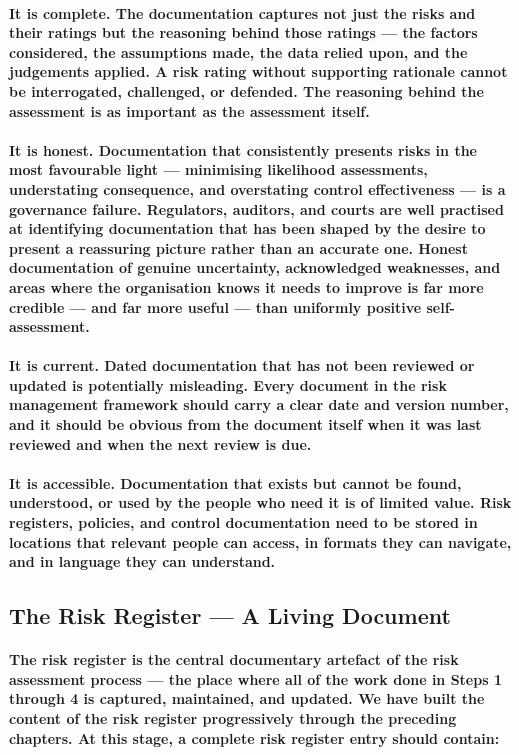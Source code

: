 \paragraph{\textbf{It is complete}. The documentation captures not just the risks and their ratings but the reasoning behind those ratings — the factors considered, the assumptions made, the data relied upon, and the judgements applied. A risk rating without supporting rationale cannot be interrogated, challenged, or defended. The reasoning behind the assessment is as important as the assessment itself.}
\paragraph{\textbf{It is honest}. Documentation that consistently presents risks in the most favourable light — minimising likelihood assessments, understating consequence, and overstating control effectiveness — is a governance failure. Regulators, auditors, and courts are well practised at identifying documentation that has been shaped by the desire to present a reassuring picture rather than an accurate one. Honest documentation of genuine uncertainty, acknowledged weaknesses, and areas where the organisation knows it needs to improve is far more credible — and far more useful — than uniformly positive self-assessment.}
\paragraph{It is current. Dated documentation that has not been reviewed or updated is potentially misleading. Every document in the risk management framework should carry a clear date and version number, and it should be obvious from the document itself when it was last reviewed and when the next review is due.}
\paragraph{\textbf{It is accessible}. Documentation that exists but cannot be found, understood, or used by the people who need it is of limited value. Risk registers, policies, and control documentation need to be stored in locations that relevant people can access, in formats they can navigate, and in language they can understand.}

\subsection{The Risk Register — A Living Document}
\paragraph{The risk register is the central documentary artefact of the risk assessment process — the place where all of the work done in Steps 1 through 4 is captured, maintained, and updated. We have built the content of the risk register progressively through the preceding chapters. At this stage, a complete risk register entry should contain:}


